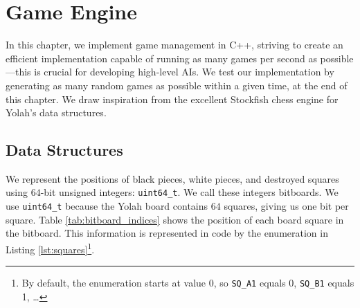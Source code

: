 \documentclass[12pt,a4paper,twoside,openright]{book}
\begin{document}






\chapter{Game Engine}
\label{ch:engine}

In this chapter, we implement game management in C++, striving to create an efficient implementation capable of running as many games per second as possible—this is crucial for developing high-level AIs. We test our implementation by generating as many random games as possible within a given time, at the end of this chapter.
We draw inspiration from the excellent Stockfish chess engine \cite{stockfish2025} for Yolah's data structures.

\section{Data Structures}

We represent the positions of black pieces, white pieces, and destroyed squares using $64$-bit unsigned integers: \texttt{uint64_t}. We call these integers bitboards. We use \texttt{uint64_t} because the Yolah board contains $64$ squares, giving us one bit per square. Table \ref{tab:bitboard_indices} shows the position of each board square in the bitboard. This information is represented in code by the enumeration in Listing \ref{lst:squares}\footnote{By default, the enumeration starts at value 0, so \texttt{SQ_A1} equals 0, \texttt{SQ_B1} equals 1, \ldots}.\\
\end{document}
